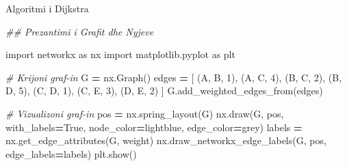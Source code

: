 \documentclass[
  ignorenonframetext,
]{beamer}
\newenvironment{Shaded}{\begin{snugshade}}{\end{snugshade}}
\newcommand{\CommentTok}[1]{\textcolor[rgb]{0.56,0.35,0.01}{\textit{#1}}}
\newcommand{\DecValTok}[1]{\textcolor[rgb]{0.00,0.00,0.81}{#1}}
\newcommand{\ImportTok}[1]{#1}
\newcommand{\NormalTok}[1]{#1}
\newcommand{\OperatorTok}[1]{\textcolor[rgb]{0.81,0.36,0.00}{\textbf{#1}}}
\newcommand{\StringTok}[1]{\textcolor[rgb]{0.31,0.60,0.02}{#1}}
\newcommand{\VariableTok}[1]{\textcolor[rgb]{0.00,0.00,0.00}{#1}}
\begin{document}
\begin{frame}[fragile]{Algoritmi i Dijkstra}
\protect\hypertarget{algoritmi-i-dijkstra}{}

\begin{Shaded}
\begin{Highlighting}[]
\CommentTok{\#\# Prezantimi i Grafit dhe Nyjeve}

\ImportTok{import}\NormalTok{ networkx }\ImportTok{as}\NormalTok{ nx}
\ImportTok{import}\NormalTok{ matplotlib.pyplot }\ImportTok{as}\NormalTok{ plt}

\CommentTok{\# Krijoni graf{-}in}
\NormalTok{G }\OperatorTok{=}\NormalTok{ nx.Graph()}
\NormalTok{edges }\OperatorTok{=}\NormalTok{ [}
\NormalTok{    (}\StringTok{\textquotesingle{}A\textquotesingle{}}\NormalTok{, }\StringTok{\textquotesingle{}B\textquotesingle{}}\NormalTok{, }\DecValTok{1}\NormalTok{),}
\NormalTok{    (}\StringTok{\textquotesingle{}A\textquotesingle{}}\NormalTok{, }\StringTok{\textquotesingle{}C\textquotesingle{}}\NormalTok{, }\DecValTok{4}\NormalTok{),}
\NormalTok{    (}\StringTok{\textquotesingle{}B\textquotesingle{}}\NormalTok{, }\StringTok{\textquotesingle{}C\textquotesingle{}}\NormalTok{, }\DecValTok{2}\NormalTok{),}
\NormalTok{    (}\StringTok{\textquotesingle{}B\textquotesingle{}}\NormalTok{, }\StringTok{\textquotesingle{}D\textquotesingle{}}\NormalTok{, }\DecValTok{5}\NormalTok{),}
\NormalTok{    (}\StringTok{\textquotesingle{}C\textquotesingle{}}\NormalTok{, }\StringTok{\textquotesingle{}D\textquotesingle{}}\NormalTok{, }\DecValTok{1}\NormalTok{),}
\NormalTok{    (}\StringTok{\textquotesingle{}C\textquotesingle{}}\NormalTok{, }\StringTok{\textquotesingle{}E\textquotesingle{}}\NormalTok{, }\DecValTok{3}\NormalTok{),}
\NormalTok{    (}\StringTok{\textquotesingle{}D\textquotesingle{}}\NormalTok{, }\StringTok{\textquotesingle{}E\textquotesingle{}}\NormalTok{, }\DecValTok{2}\NormalTok{)}
\NormalTok{]}
\NormalTok{G.add\_weighted\_edges\_from(edges)}

\CommentTok{\# Vizualizoni graf{-}in}
\NormalTok{pos }\OperatorTok{=}\NormalTok{ nx.spring\_layout(G)}
\NormalTok{nx.draw(G, pos, with\_labels}\OperatorTok{=}\VariableTok{True}\NormalTok{, node\_color}\OperatorTok{=}\StringTok{\textquotesingle{}lightblue\textquotesingle{}}\NormalTok{, edge\_color}\OperatorTok{=}\StringTok{\textquotesingle{}grey\textquotesingle{}}\NormalTok{)}
\NormalTok{labels }\OperatorTok{=}\NormalTok{ nx.get\_edge\_attributes(G, }\StringTok{\textquotesingle{}weight\textquotesingle{}}\NormalTok{)}
\NormalTok{nx.draw\_networkx\_edge\_labels(G, pos, edge\_labels}\OperatorTok{=}\NormalTok{labels)}
\NormalTok{plt.show()}
\end{Highlighting}
\end{Shaded}
\end{frame}
\end{document}
